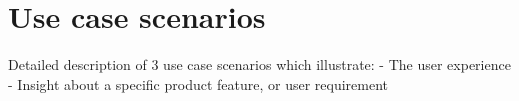 \section{Use case scenarios}
Detailed description of 3 use case scenarios which illustrate:
- The user experience
- Insight about a specific product feature, or user requirement